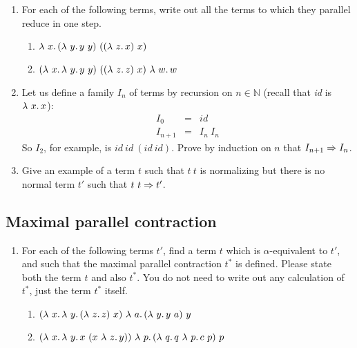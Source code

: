 \begin{enumerate}
\item For each of the following terms, write out all the terms to which they parallel reduce in one step.
  \begin{enumerate}
  \item $\lam{x}{(\lam{y}{y\ y})\ ((\lam{z}{x})\ x)}$
  \item $(\lam{x}{\lam{y}{y\ y}})\ ((\lam{z}{z})\ x)\ \lam{w}{w}$
  \end{enumerate}

\item Let us define a family $I_n$ of terms by recursion on $n\in\mathbb{N}$ (recall that \textit{id} is $\lambda\ x.\, x$):
  \[
  \begin{array}{lll}
    I_0 & = & \textit{id} \\
    I_{n+1} & = & I_n\ I_n
  \end{array}
  \]
  \noindent So $I_2$, for example, is
  $\textit{id}\ \textit{id}\ (\textit{id}\ \textit{id})$.  Prove by
  induction on $n$ that $I_{n+1} \Rightarrow I_n$.

  \item Give an example of a term $t$ such that $t\ t$ is normalizing but there is no normal term $t'$ such that $t\ t\Rightarrow t'$.

\end{enumerate}

\subsection{Maximal parallel contraction}
    
\begin{enumerate}
\item For each of the following terms $t'$, find a term $t$ which is $\alpha$-equivalent to $t'$, and
  such that the maximal parallel contraction $t^*$ is defined.  Please
  state both the term $t$ and also $t^*$.  You do not need to write out any calculation of $t^*$, just the term $t^*$ itself.
  \begin{enumerate}
  \item $(\lam{x}{\lam{y}{(\lam{z}{z})\ x}})\ \lam{a}{(\lam{y}{y\ a})\ y}$
  \item $(\lam{x}{\lam{y}{x\ (x\ \lam{z}{y})}})\ \lam{p}{(\lam{q}{q\ \lam{p}{c\ p}})\ p}$
  \end{enumerate}
  \end{enumerate}




